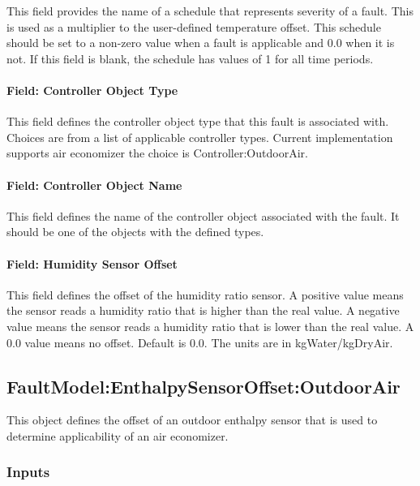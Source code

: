 This field provides the name of a schedule that represents severity of a fault. This is used as a multiplier to the user-defined temperature offset. This schedule should be set to a non-zero value when a fault is applicable and 0.0 when it is not. If this field is blank, the schedule has values of 1 for all time periods.

\paragraph{Field: Controller Object Type}\label{field-controller-object-type-1}

This field defines the controller object type that this fault is associated with. Choices are from a list of applicable controller types. Current implementation supports air economizer the choice is Controller:OutdoorAir.

\paragraph{Field: Controller Object Name}\label{field-controller-object-name-1}

This field defines the name of the controller object associated with the fault. It should be one of the objects with the defined types.

\paragraph{Field: Humidity Sensor Offset}\label{field-humidity-sensor-offset}

This field defines the offset of the humidity ratio sensor. A positive value means the sensor reads a humidity ratio that is higher than the real value. A negative value means the sensor reads a humidity ratio that is lower than the real value. A 0.0 value means no offset. Default is 0.0. The units are in kgWater/kgDryAir.

\subsection{FaultModel:EnthalpySensorOffset:OutdoorAir}\label{faultmodelenthalpysensoroffsetoutdoorair}

This object defines the offset of an outdoor enthalpy sensor that is used to determine applicability of an air economizer.

\subsubsection{Inputs}\label{inputs-2-024}

